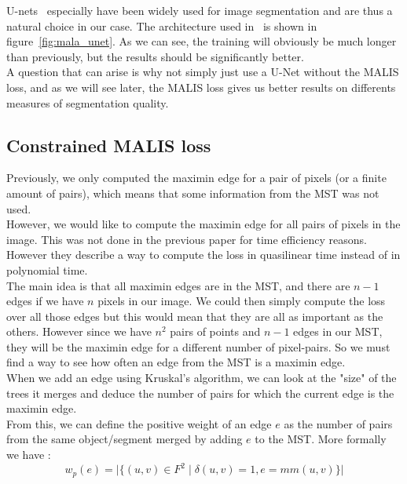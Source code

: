 U-nets~\cite{ronneberger_2015} especially have been widely used for image segmentation and are thus a
natural choice in our case. The architecture used in~\cite{funke_large_2019}
is shown in figure~\ref{fig:mala_unet}. As we can see, the training will
obviously be much longer than previously, but the results should be
significantly better.\\
A question that can arise is why not simply just use a U-Net without the MALIS
loss, and as we will see later, the MALIS loss gives us better results on
differents measures of segmentation quality.


\subsection{Constrained MALIS loss}

Previously, we only computed the maximin edge for a pair of pixels (or a finite
amount of pairs), which means that some information from the MST was not
used.\\
However, we would like to compute the maximin edge for all pairs of pixels in
the image. This was not done in the previous paper for time efficiency
reasons.\\
However they describe a way to compute the loss in quasilinear time instead
of in polynomial time.\\

The main idea is that all maximin edges are in the MST, and there are $n-1$
edges if we have $n$ pixels in our image. We could then simply compute the loss
over all those edges but this would mean that they are all as important as the
others. However since we have $n^2$ pairs of points and $n-1$ edges in our MST,
they will be the maximin edge for a different number of pixel-pairs. So we must
find a way to see how often an edge from the MST is a maximin edge.\\

When we add an edge using Kruskal's algorithm, we can look at the "size" of the
trees it merges and deduce the number of pairs for which the current edge is
the maximin edge.\\

From this, we can define the positive weight of an edge $e$ as the number of pairs
from the same object/segment merged by adding $e$ to the MST. More formally we
have :
\begin{equation*}
	w_p(e)=\lvert \{(u,v)\in F^2 \;|\;\delta(u,v)=1, e=mm(u,v) \}   \rvert
\end{equation*}

